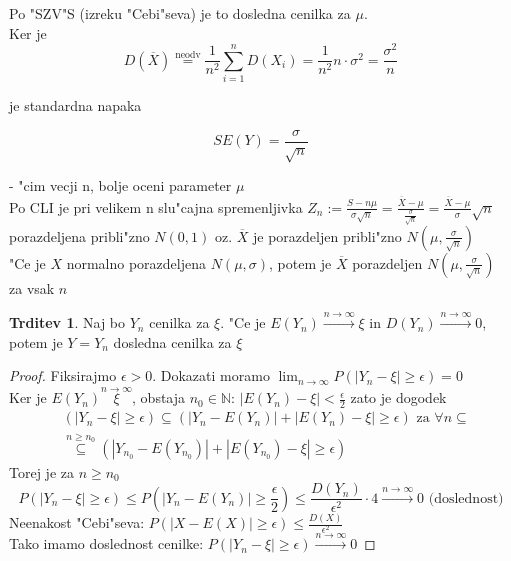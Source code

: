 \documentclass[a4paper,12pt]{article}
\theoremstyle{definition}
\newtheorem{claim}[counter]{Trditev}
\theoremstyle{remark}
\newcommand{\N}{\mathbb{N}}
\begin{document}
Po "SZV"S (izreku "Cebi"seva) je to dosledna cenilka za $\mu$. \\
Ker je
\begin{equation*}
    D(\overline{X}) \stackrel{\text{neodv}}{=} \frac{1}{n^2} \sum_{i=1}^n D(X_i) =
    \frac{1}{n^2} n \cdot \sigma^2 = \frac{\sigma^2}{n}
\end{equation*}

je standardna napaka

\begin{equation*}
    SE(Y) = \frac{\sigma}{\sqrt{n}}
\end{equation*}

- "cim vecji n, bolje oceni parameter $\mu$ \\
Po CLI je pri velikem n slu"cajna spremenljivka $Z_n := \frac{S - n \mu}{\sigma \sqrt{n}} =
\frac{\overline{X} - \mu}{\frac{\sigma}{\sqrt{n}}} = \frac{\overline{X} - \mu}{\sigma} \sqrt{n}$
porazdeljena pribli"zno $N(0,1)$ oz. $\overline{X}$ je porazdeljen pribli"zno $N(\mu, \frac{\sigma}{\sqrt{n}})$ \\
"Ce je $X$ normalno porazdeljena $N(\mu, \sigma)$, potem je $\overline{X}$ porazdeljen
$N(\mu, \frac{\sigma}{\sqrt{n}})$ za vsak $n$

\begin{claim}
    Naj bo $Y_n$ cenilka za $\xi$. "Ce je $E(Y_n) \stackrel{n \to \infty}{\to} \xi$ in
    $D(Y_n) \stackrel{n \to \infty}{\to} 0$, potem je $Y=Y_n$ dosledna cenilka za $\xi$
\end{claim}

\begin{proof}
    Fiksirajmo $\epsilon > 0$. Dokazati moramo $\lim_{n \to \infty} P(|Y_n - \xi| \geq \epsilon) = 0$ \\
    Ker je $E(Y_n) \stackrel{n \to \infty}{\xi}$, obstaja $n_0 \in \N$: $|E(Y_n) - \xi| < \frac{\epsilon}{2}$
    zato je dogodek
    \begin{align*}
        &(|Y_n - \xi| \geq \epsilon) \subseteq (|Y_n - E(Y_n)| + |E(Y_n) - \xi| \geq \epsilon) \text{ za }
            \forall n \subseteq\\
        &\stackrel{n \geq n_0}{\subseteq} (|Y_{n_0} - E(Y_{n_0})| + |E(Y_{n_0}) - \xi| \geq \epsilon)
    \end{align*}
    Torej je za $n \geq n_0$
    \begin{equation*}
        P(|Y_n - \xi| \geq \epsilon) \leq P(|Y_n - E(Y_n)| \geq  \frac{\epsilon}{2})
        \leq \frac{D(Y_n)}{\epsilon^2} \cdot 4 \stackrel{n \to \infty}{\to} 0 \text{ (doslednost)}
    \end{equation*}
    Neenakost "Cebi"seva: $P(|X - E(X)| \geq \epsilon) \leq \frac{D(X)}{\epsilon^2}$ \\
    Tako imamo doslednost cenilke: $P(|Y_n - \xi| \geq \epsilon) \stackrel{n \to \infty}{\to} 0$
\end{proof}
\end{document}
